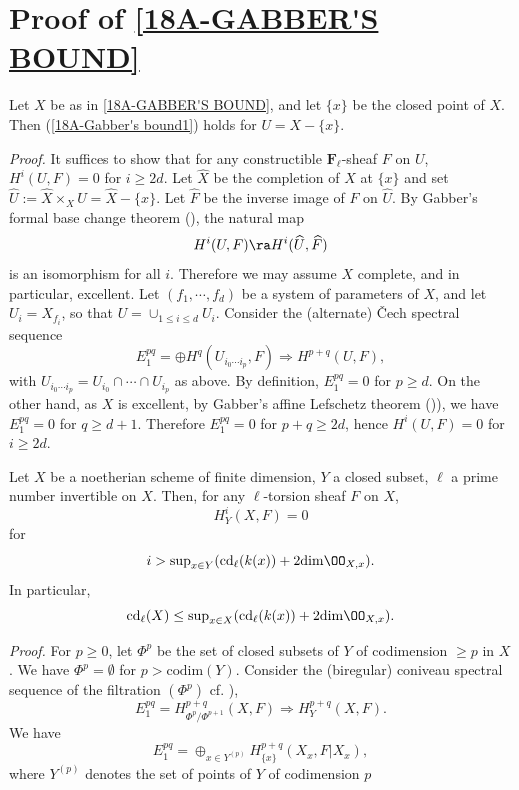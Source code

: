 \documentclass[10pt]{../fichiers-configuration-latex/smfart}
\begin{document}
\section{Proof of \ref{18A-GABBER'S BOUND}} \begin{lemma}\label{18A-punctured spectrum} Let $X$ be
as in \ref{18A-GABBER'S BOUND}, and let $\{x\}$ be the closed point of $X$. Then (\ref{18A-Gabber's
bound1}) holds for $U = X - \{x\}$.  \end{lemma} \textit{Proof.} It suffices to show that for any
constructible $\mathbf{F}_{\ell}$-sheaf $F$ on $U$, $H^i(U,F) = 0$ for $i \ge 2d$. Let $\widehat X$
be the completion of $X$ at $\{x\}$ and set $\widehat U := \widehat X \times_X U = \widehat X -
\{x\}$. Let $\widehat F$ be the inverse image of $F$ on $\widehat U$. By Gabber's formal base change
theorem (\cite[6.6.4]{TUBULAR@Fujiwara}), the natural map $$ H^i(U,F) \ra H^i(\widehat U, \widehat
F) $$ is an isomorphism for all $i$. Therefore we may assume $X$ complete, and in particular,
excellent. Let $(f_1,\cdots,f_d)$ be a system of parameters of $X$, and let $U_i = X_{f_i}$, so that
$U = \cup_{1 \le i \le d}U_i$. Consider the (alternate) \v Cech spectral sequence $$ E^{pq}_1 =
\oplus H^q(U_{i_0 \cdots i_p},F) \Rightarrow H^{p+q}(U,F), $$ with $U_{i_0 \cdots i_p} = U_{i_0}
\cap \cdots \cap U_{i_p}$ as above.  By definition, $E^{pq}_1 = 0$ for $p \ge d$. On the other hand,
as $X$ is excellent, by Gabber's affine Lefschetz theorem
()), we have $E^{pq}_1 = 0$ for $q \ge d+1$. Therefore
$E^{pq}_1 = 0$ for $p+q \ge 2d$, hence $H^i(U,F) = 0$ for $i \ge 2d$.
\begin{lemma}\label{18A-punctual bound} Let $X$ be a noetherian scheme of finite dimension, $Y$ a
closed subset, $\ell$ a prime number invertible on $X$. Then, for any $\ell$-torsion sheaf $F$ on
$X$, $$ H^i_Y(X,F) = 0 $$ for $$ i > \mathrm{sup}_{x \in Y} (\mathrm{cd}_{\ell}(k(x)) + 2
\mathrm{dim} \OO_{X,x}).  $$ In particular, $$ \mathrm{cd}_{\ell}(X) \le \mathrm{sup}_{x \in
X} (\mathrm{cd}_{\ell}(k(x)) + 2 \mathrm{dim} \OO_{X,x}).  $$ \end{lemma} \textit{Proof.}
For $p \ge 0$, let $\Phi^p$ be the set of closed subsets of $Y$ of codimension $\ge p$ in $X$. We
have $\Phi^p = \emptyset$ for $p > \mathrm{codim}(Y)$.  Consider the (biregular) coniveau spectral
sequence of the filtration $(\Phi^p)$ cf. \cite[10.1]{BrauerIII@Grothendieck}),
\begin{equation}\label{18A-coniveau} E^{pq}_1 = H^{p+q}_{\Phi^p/\Phi^{p+1}}(X,F) \Rightarrow
H^{p+q}_Y(X,F).  \end{equation} We have $$ E^{pq}_1 = \oplus_{x \in Y^{(p)}}
H^{p+q}_{\{x\}}(X_x,F|X_x), $$ where $Y^{(p)}$ denotes the set of points of $Y$ of codimension $p$
\end{document}
